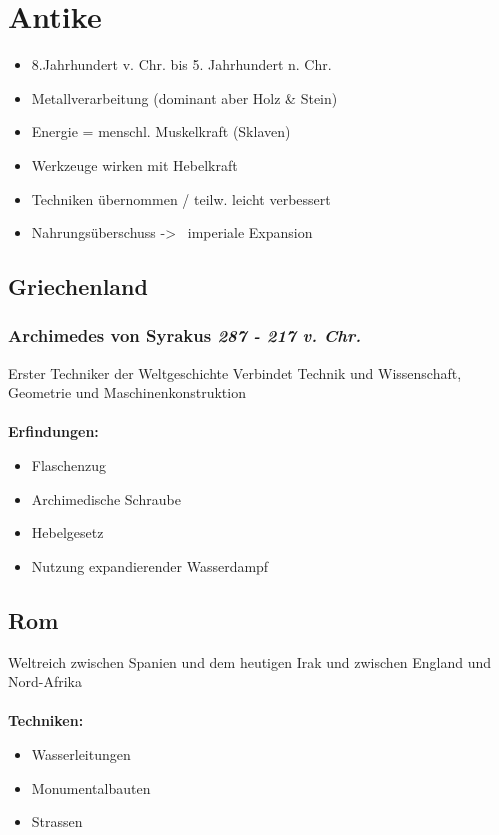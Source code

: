 \documentclass{report}
\begin{document}
\newpage

\section{Antike}
\begin{itemize}
	\item 8.Jahrhundert v. Chr. bis 5. Jahrhundert n. Chr.
	\item Metallverarbeitung (dominant aber Holz \& Stein)
	\item Energie = menschl. Muskelkraft (Sklaven)
	\item Werkzeuge wirken mit Hebelkraft
	\item Techniken übernommen / teilw. leicht verbessert
	\item Nahrungsüberschuss -\textgreater~ imperiale Expansion
\end{itemize}

\subsection{Griechenland}
\subsubsection{Archimedes von Syrakus \rm{\textit{287 - 217 v. Chr.}}}
Erster Techniker der Weltgeschichte
Verbindet Technik und Wissenschaft, Geometrie und Maschinenkonstruktion\\\\
\textbf{Erfindungen:}
\begin{itemize}
	\item Flaschenzug
	\item Archimedische Schraube
	\item Hebelgesetz
	\item Nutzung expandierender Wasserdampf
\end{itemize}

\subsection{Rom}
Weltreich zwischen Spanien und dem heutigen Irak und zwischen England und Nord-Afrika\\\\
\textbf{Techniken:}
\begin{itemize}
	\item Wasserleitungen
	\item Monumentalbauten
	\item Strassen
\end{itemize}
\end{document}
